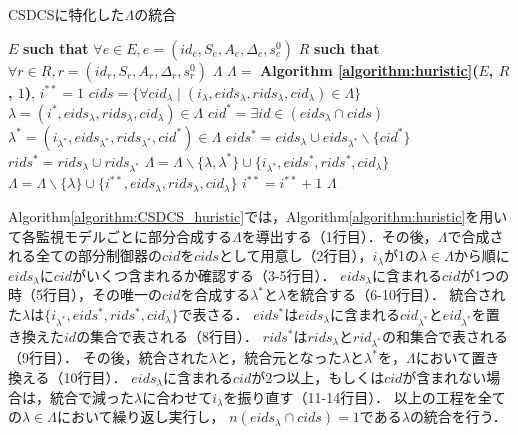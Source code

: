 \begin{algorithm}[h]
\caption{CSDCSに特化した$\Lambda$の統合}
\label{algorithm:CSDCS_huristic}
\begin{algorithmic}[1]
\renewcommand{\algorithmicrequire}{\textbf{Input:}}
\renewcommand{\algorithmicensure}{\textbf{Output:}}
\REQUIRE $E$ {\bf such that} $\forall e \in E, e = (id_{e}, S_{e}, A_{e}, \Delta_{e}, s^0_{e})$
\REQUIRE $R$ {\bf such that} $\forall r \in R, r = (id_{r}, S_{r}, A_{r}, \Delta_{r}, s^0_{r})$
\ENSURE  $\Lambda$
\STATE $\Lambda =$ {\bf Algorithm \ref{algorithm:huristic}($E$, $R$, $1$)}, \;\;$i^{**} = 1$
\STATE $cids = \{\forall cid_{\lambda} \mid (i_{\lambda}, eids_{\lambda}, rids_{\lambda}, cid_{\lambda}) \in \Lambda\}$
    \STATE $\lambda = (i^*, eids_{\lambda}, rids_{\lambda}, cid_{\lambda}) \in \Lambda$
        \STATE $cid^* = \exists id \in (eids_{\lambda} \cap cids)$
        \STATE $\lambda^* = (i_{\lambda^*}, eids_{\lambda^*}, rids_{\lambda^*}, cid^*) \in \Lambda$
        \STATE $eids^* = eids_{\lambda} \cup eids_{\lambda^*} \backslash \{cid^*\}$
        \STATE $rids^* = rids_{\lambda} \cup rids_{\lambda^*}$
        \STATE $\Lambda = \Lambda \backslash \{\lambda ,\lambda^*\} \cup \{i_{\lambda^*}, eids^*, rids^*, cid_{\lambda}\}$
    \ELSE
        \STATE $\Lambda = \Lambda \backslash \{\lambda\} \cup \{i^{**}, eids_{\lambda}, rids_{\lambda}, cid_{\lambda}\}$
        \STATE $i^{**} = i^{**} + 1$
    \ENDIF
\ENDFOR
{} $\Lambda$
\end{algorithmic}
\end{algorithm}

Algorithm\ref{algorithm:CSDCS_huristic}では，Algorithm\ref{algorithm:huristic}を用いて各監視モデルごとに部分合成する$\Lambda$を導出する（1行目）．その後，$\Lambda$で合成される全ての部分制御器の$cid$を$cids$として用意し（2行目），$i_{\lambda}$が1の$\lambda \in \Lambda$から順に$eids_{\lambda}$に$cid$がいくつ含まれるか確認する（3-5行目）．
$eids_{\lambda}$に含まれる$cid$が1つの時（5行目），その唯一の$cid$を合成する$\lambda^*$と$\lambda$を統合する（6-10行目）．
統合された$\lambda$は$\{i_{\lambda^*}, eids^*, rids^*, cid_{\lambda}\}$で表さる．
$eids^*$は$eids_{\lambda}$に含まれる$cid_{\lambda^*}$と$eid_{\lambda^*}$を置き換えた$id$の集合で表される（8行目）．
$rids^*$は$rids_{\lambda}$と$rid_{\lambda^*}$の和集合で表される（9行目）．
その後，統合された$\lambda$と，統合元となった$\lambda$と$\lambda^*$を，$\Lambda$において置き換える（10行目）．
$eids_{\lambda}$に含まれる$cid$が2つ以上，もしくは$cid$が含まれない場合は，統合で減った$\lambda$に合わせて$i_{\lambda}$を振り直す（11-14行目）．
以上の工程を全ての$\lambda \in \Lambda$において繰り返し実行し， $n(eids_{\lambda} \cap cids) = 1$である$\lambda$の統合を行う．

